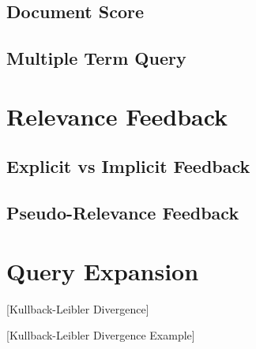 \subsection{Document Score}
\label{sec:doc-score}

\subsection{Multiple Term Query}

\section{Relevance Feedback}

\subsection{Explicit vs Implicit Feedback}

\subsection{Pseudo-Relevance Feedback}

\section{Query Expansion}
\label{sec:query-expansion}

[Kullback-Leibler Divergence]


[Kullback-Leibler Divergence Example]
